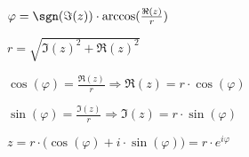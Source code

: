 $\varphi = \sgn(\Im(z)) \cdot \arccos(\frac{\Re(z)}{r})$

$r = \sqrt{\Im(z)^2+\Re(z)^2}$

$\cos(\varphi) = \frac{\Re(z)}{r} \Rightarrow \Re(z) = r \cdot \cos(\varphi)$

$\sin(\varphi) = \frac{\Im(z)}{r} \Rightarrow \Im(z) = r \cdot \sin(\varphi)$

$z = r \cdot \bigl(\cos(\varphi) + i \cdot \sin(\varphi) \bigr) = r \cdot e^{i\varphi}$
